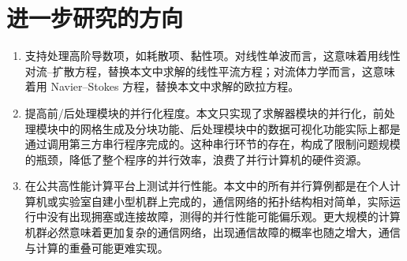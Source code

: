 \section*{进一步研究的方向}
\begin{enumerate}[wide]
\item 支持处理高阶导数项，如耗散项、黏性项。对线性单波而言，这意味着用线性对流–扩散方程，替换本文中求解的线性平流方程；对流体力学而言，这意味着用
Navier–Stokes 方程，替换本文中求解的欧拉方程。 
\item 提高前/后处理模块的并行化程度。本文只实现了求解器模块的并行化，前处理模块中的网格生成及分块功能、后处理模块中的数据可视化功能实际上都是通过调用第三方串行程序完成的。这种串行环节的存在，构成了限制问题规模的瓶颈，降低了整个程序的并行效率，浪费了并行计算机的硬件资源。
\item 在公共高性能计算平台上测试并行性能。本文中的所有并行算例都是在个人计算机或实验室自建小型机群上完成的，通信网络的拓扑结构相对简单，实际运行中没有出现拥塞或连接故障，测得的并行性能可能偏乐观。更大规模的计算机群必然意味着更加复杂的通信网络，出现通信故障的概率也随之增大，通信与计算的重叠可能更难实现。
\end{enumerate}
